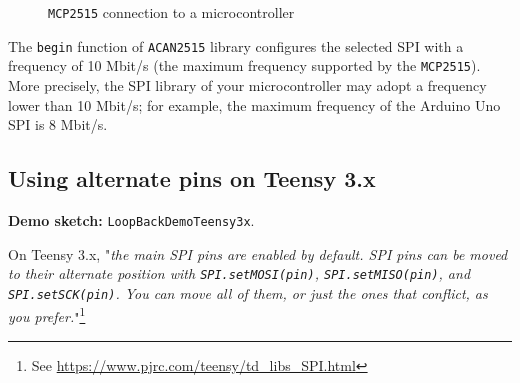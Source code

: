 \documentclass[9pt, a4paper, obeyspaces]{extarticle}
\newcommand \subsectionLabel[2]{\subsection{#1}\label{subsec:#2}}
\newcommand\labelFigure[1]{\label{fig:#1}}
\begin{document}
\begin{figure}[!ht]
  \small
  \centering
  \caption{\texttt{MCP2515} connection to a microcontroller}
  \labelFigure{figureHardwareSPI}
\end{figure}


The \texttt{begin} function of \texttt{ACAN2515} library configures the selected SPI with a frequency of 10 Mbit/s (the maximum frequency supported by the \texttt{MCP2515}). More precisely, the SPI library of your microcontroller may adopt a frequency lower than 10 Mbit/s; for example, the maximum frequency of the Arduino Uno SPI is 8 Mbit/s.




\subsectionLabel{Using alternate pins on Teensy 3.x}{TeensyAlternatePins}

{\bf Demo sketch: } \texttt{LoopBackDemoTeensy3x}.

On Teensy 3.x, "\emph{the main SPI pins are enabled by default. SPI pins can be moved to their alternate position with \texttt{SPI.setMOSI(pin)}, \texttt{SPI.setMISO(pin)}, and \texttt{SPI.setSCK(pin)}. You can move all of them, or just the ones that conflict, as you prefer.}"\footnote{See \url{https://www.pjrc.com/teensy/td_libs_SPI.html}}
\end{document}
